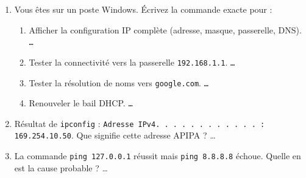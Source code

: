 \documentclass[11pt]{article}
\begin{document}
\begin{exercice}
\begin{enumerate}
    \item Vous êtes sur un poste Windows. Écrivez la commande exacte pour :
    \begin{enumerate}
        \item Afficher la configuration IP complète (adresse, masque, passerelle, DNS). \texttt{\ldots}
        \item Tester la connectivité vers la passerelle \texttt{192.168.1.1}. \texttt{\ldots}
        \item Tester la résolution de noms vers \texttt{google.com}. \texttt{\ldots}
        \item Renouveler le bail DHCP. \texttt{\ldots}
    \end{enumerate}
    \item Résultat de \texttt{ipconfig} : \texttt{Adresse IPv4. . . . . . . . . . . . : 169.254.10.50}. Que signifie cette adresse APIPA ? \ldots
    \item La commande \texttt{ping 127.0.0.1} réussit mais \texttt{ping 8.8.8.8} échoue. Quelle en est la cause probable ? \ldots
\end{enumerate}
\end{exercice}
\end{document}
